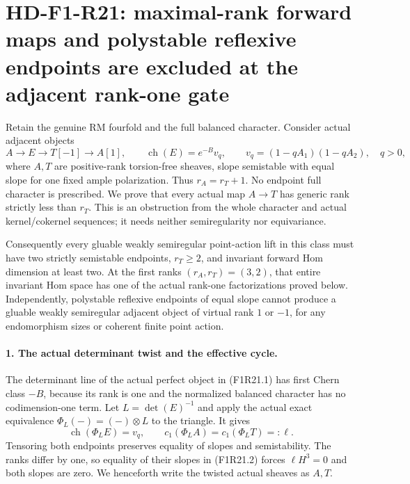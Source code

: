 \section[HD-F1-R21: actual equal-slope endpoint maps]{HD-F1-R21: maximal-rank forward maps and polystable reflexive endpoints are excluded at the adjacent rank-one gate}
\label{sec:followup-rm-equal-slope-maps}

Retain the genuine RM fourfold and the full balanced
character. Consider actual adjacent objects
\[
 A\longrightarrow E\longrightarrow T[-1]\longrightarrow A[1],
 \qquad \operatorname{ch}(E)=e^{-B}v_q,
 \qquad v_q=(1-qA_1)(1-qA_2),\quad q>0,
 \tag{F1R21.1}
\]
where $A,T$ are positive-rank torsion-free sheaves,
slope semistable with equal slope for one fixed ample
polarization. Thus $r_A=r_T+1$. No endpoint full
character is prescribed. We prove that every actual
map $A\to T$ has generic rank strictly less than $r_T$.
This is an obstruction from the whole character and
actual kernel/cokernel sequences; it needs neither
semiregularity nor equivariance.

Consequently every gluable weakly semiregular point-action
lift in this class must have two strictly semistable
endpoints, $r_T\ge2$, and invariant forward Hom dimension
at least two. At the first ranks $(r_A,r_T)=(3,2)$,
that entire invariant Hom space has one of the actual
rank-one factorizations proved below. Independently,
polystable reflexive endpoints of equal slope cannot
produce a gluable weakly semiregular adjacent object
of virtual rank $1$ or $-1$, for any endomorphism sizes
or coherent finite point action.

\paragraph{1. The actual determinant twist and the effective cycle.}
The determinant line of the actual perfect object in
(F1R21.1) has first Chern class $-B$, because its rank
is one and the normalized balanced character has no
codimension-one term. Let
$L=\det(E)^{-1}$ and apply the actual exact equivalence
$\Phi_L(-)=(-)\otimes L$ to the triangle. It gives
\[
 \operatorname{ch}(\Phi_L E)=v_q,\qquad
 c_1(\Phi_L A)=c_1(\Phi_L T)=:\ell.
 \tag{F1R21.2}
\]
Tensoring both endpoints preserves equality of slopes
and semistability. The ranks differ by one, so equality
of their slopes in (F1R21.2) forces
$\ell H^3=0$ and both slopes are zero. We henceforth
write the twisted actual sheaves as $A,T$.

